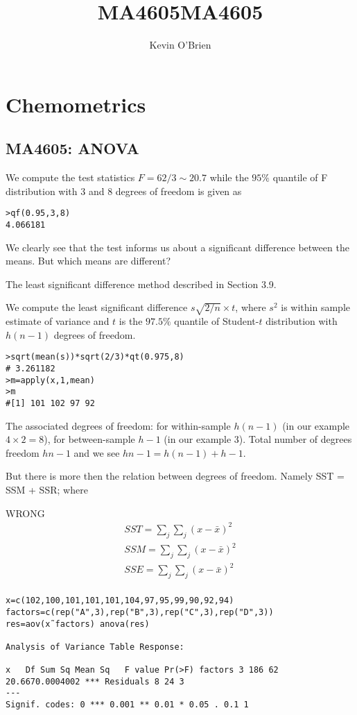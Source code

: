 \documentclass[12pt, a4paper]{report}
\title{MA4605}
\author{ } \date{ }
\theoremstyle{plain}
\theoremstyle{definition}
\theoremstyle{remark}
\begin{document}
\author{Kevin O'Brien}
\title{MA4605}

\tableofcontents \setcounter{tocdepth}{2}

\chapter{Chemometrics}






\section{MA4605: ANOVA}
We compute the test statistics $F = 62/3 \sim 20.7$ while the
$95\%$ quantile of F distribution with 3 and 8 degrees of freedom
is given as
\begin{verbatim}
>qf(0.95,3,8)
4.066181
\end{verbatim}

We clearly see that the test informs us about a significant
difference between the means. But which means are different?

The least significant difference method described in Section 3.9.

We compute the least significant difference $s \sqrt{2/n} \times
t$, where $s^{2}$ is within sample estimate of variance and $t$ is
the $97.5\%$ quantile of Student-$t$ distribution with $h(n-1)$
degrees of freedom.

\begin{verbatim}
>sqrt(mean(s))*sqrt(2/3)*qt(0.975,8)
# 3.261182
>m=apply(x,1,mean)
>m
#[1] 101 102 97 92
\end{verbatim}

The associated degrees of freedom: for within-sample $h(n - 1)$
(in our example $4 \times 2 = 8$), for between-sample $h - 1$ (in
our example 3). Total number of degrees freedom $hn-1$ and we see
$hn - 1 = h(n-1) + h - 1$.

But there is more then the relation between degrees of freedom.
Namely SST = SSM + SSR; where

WRONG
\begin{eqnarray}
SST = \sum_{j}\sum_{j}(x-\bar{x})^2\\
SSM= \sum_{j}\sum_{j}(x-\bar{x})^2\\
SSE = \sum_{j}\sum_{j}(x-\bar{x})^2\\
\end{eqnarray}


\begin{verbatim}
x=c(102,100,101,101,101,104,97,95,99,90,92,94)
factors=c(rep("A",3),rep("B",3),rep("C",3),rep("D",3))
res=aov(x˜factors) anova(res)

Analysis of Variance Table Response:

x   Df Sum Sq Mean Sq   F value Pr(>F) factors 3 186 62
20.6670.0004002 *** Residuals 8 24 3
---
Signif. codes: 0 *** 0.001 ** 0.01 * 0.05 . 0.1 1
\end{verbatim}
\newpage
\end{document}
